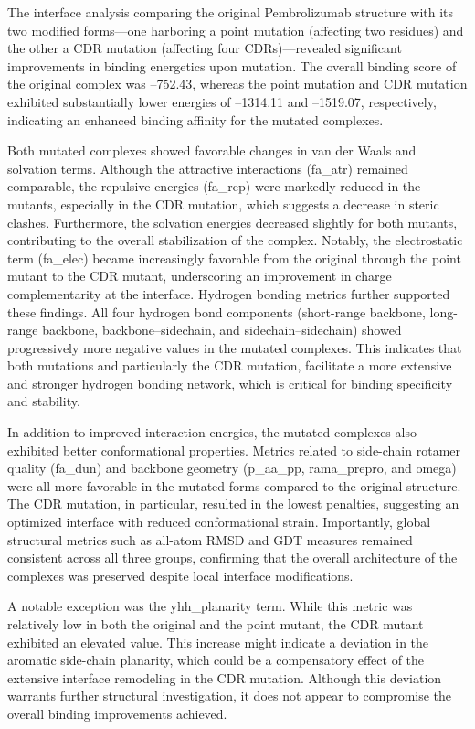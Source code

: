 \documentclass[11pt]{article}
\begin{document}
The interface analysis comparing the original Pembrolizumab structure with its two modified forms—one harboring a point mutation (affecting two residues) and the other a CDR mutation (affecting four CDRs)—revealed significant improvements in binding energetics upon mutation. The overall binding score of the original complex was –752.43, whereas the point mutation and CDR mutation exhibited substantially lower energies of –1314.11 and –1519.07, respectively, indicating an enhanced binding affinity for the mutated complexes.

Both mutated complexes showed favorable changes in van der Waals and solvation terms. Although the attractive interactions (fa\_atr) remained comparable, the repulsive energies (fa\_rep) were markedly reduced in the mutants, especially in the CDR mutation, which suggests a decrease in steric clashes. Furthermore, the solvation energies decreased slightly for both mutants, contributing to the overall stabilization of the complex. Notably, the electrostatic term (fa\_elec) became increasingly favorable from the original through the point mutant to the CDR mutant, underscoring an improvement in charge complementarity at the interface. Hydrogen bonding metrics further supported these findings. All four hydrogen bond components (short-range backbone, long-range backbone, backbone–sidechain, and sidechain–sidechain) showed progressively more negative values in the mutated complexes. This indicates that both mutations and particularly the CDR mutation, facilitate a more extensive and stronger hydrogen bonding network, which is critical for binding specificity and stability.

In addition to improved interaction energies, the mutated complexes also exhibited better conformational properties. Metrics related to side-chain rotamer quality (fa\_dun) and backbone geometry (p\_aa\_pp, rama\_prepro, and omega) were all more favorable in the mutated forms compared to the original structure. The CDR mutation, in particular, resulted in the lowest penalties, suggesting an optimized interface with reduced conformational strain. Importantly, global structural metrics such as all-atom RMSD and GDT measures remained consistent across all three groups, confirming that the overall architecture of the complexes was preserved despite local interface modifications.

A notable exception was the yhh\_planarity term. While this metric was relatively low in both the original and the point mutant, the CDR mutant exhibited an elevated value. This increase might indicate a deviation in the aromatic side-chain planarity, which could be a compensatory effect of the extensive interface remodeling in the CDR mutation. Although this deviation warrants further structural investigation, it does not appear to compromise the overall binding improvements achieved.
\end{document}
